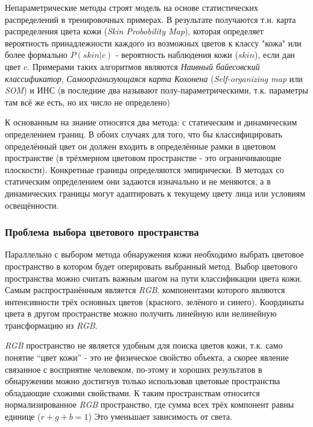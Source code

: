 \documentclass[12pt]{report}
\begin{document}
Непараметрические методы строят модель на основе статистических распределений в тренировочных примерах. В 
результате 
получаются т.н. карта распределения цвета кожи (\textit{Skin Probobility Map}), которая определяет вероятность 
принадлежности каждого из возможных цветов к классу "кожа" или более формально $P(skin|c)$ - вероятность наблюдения 
кожи ($skin$), если дан цвет $c$. Примерами таких алгоритмов являются \emph{Наивный байесовский классификатор}, 
\emph
{Самоорганизующаяся карта Кохонена} (\textit{Self-organizing map} или \textit{SOM}) и ИНС (в \citep{xu2006color} 
последние два называют полу-параметрическими, т.к. параметры там всё же есть, но их число не определено)

К основанным на знание относятся два метода: с статическим и динамическим определением границ. В обоих случаях для 
того, что бы классифицировать определённый цвет он должен входить в определённые рамки в цветовом пространстве (в 
трёхмерном цветовом пространстве - это ограничивающие плоскости). Конкретные границы определяются эмпирически. В 
методах со статическим определением они задаются изначально и не меняются, а в динамических границы могут 
адаптировать к текущему цвету лица или условиям освещённости. 

\subsubsection{Проблема выбора цветового пространства}
Параллельно с выбором метода обнаружения кожи необходимо выбрать цветовое пространство в котором будет оперировать 
выбранный метод. Выбор цветового пространства можно считать важным шагом на пути классификации цвета кожи. Самым 
распространённым является \textit{RGB}, компонентами которого являются интенсивности трёх основных цветов 
(красного, 
зелёного и синего). Координаты цвета в другом пространстве можно получить линейную или нелинейную трансформацию из 
\textit{RGB}. \cite{kakumanu2007survey} 

\textit{RGB} пространство не является удобным для поиска цветов кожи, т.к. само понятие ``цвет кожи'' - это не 
физическое свойство объекта, а скорее явление связанное с восприятие человеком, по-этому и хороших результатов в 
обнаружении можно достигнув только использовав цветовые пространства обладающие схожими свойствами. К таким 
пространствам относится нормализированное \textit{RGB} пространство, где сумма всех трёх компонент равны единице 
($r
+g+b=1$) Это уменьшает зависимость от света. \citep{vezhnevets2003survey}
\end{document}
